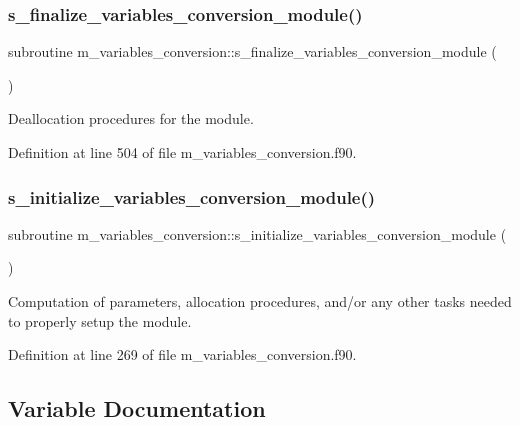 \subsubsection{\texorpdfstring{s\+\_\+finalize\+\_\+variables\+\_\+conversion\+\_\+module()}{s\_finalize\_variables\_conversion\_module()}}
{\footnotesize\ttfamily subroutine m\+\_\+variables\+\_\+conversion\+::s\+\_\+finalize\+\_\+variables\+\_\+conversion\+\_\+module (\begin{DoxyParamCaption}{ }\end{DoxyParamCaption})}



Deallocation procedures for the module. 



Definition at line 504 of file m\+\_\+variables\+\_\+conversion.\+f90.

\mbox{\label{namespacem__variables__conversion_a3645e5a02bfdcb5d3a8f68f9c00cb051}} 
\subsubsection{\texorpdfstring{s\+\_\+initialize\+\_\+variables\+\_\+conversion\+\_\+module()}{s\_initialize\_variables\_conversion\_module()}}
{\footnotesize\ttfamily subroutine m\+\_\+variables\+\_\+conversion\+::s\+\_\+initialize\+\_\+variables\+\_\+conversion\+\_\+module (\begin{DoxyParamCaption}{ }\end{DoxyParamCaption})}



Computation of parameters, allocation procedures, and/or any other tasks needed to properly setup the module. 



Definition at line 269 of file m\+\_\+variables\+\_\+conversion.\+f90.



\subsection{Variable Documentation}
\mbox{\label{namespacem__variables__conversion_a3bd150e984abfe14c8269e759ea4cb60}} 

